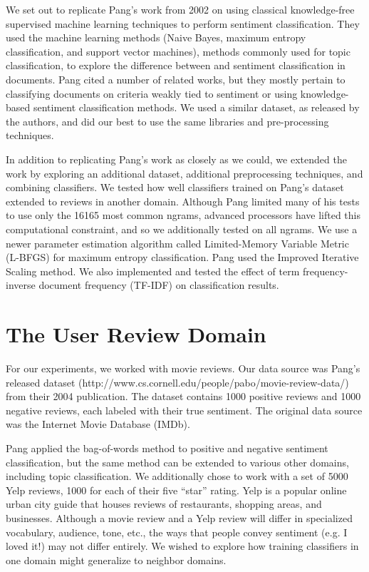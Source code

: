 \documentclass[10pt,twocolumn,letterpaper]{article}
\begin{document}
We set out to replicate Pang’s work from 2002 on using classical knowledge-free supervised machine learning techniques to perform sentiment classification. They used the machine learning methods (Naive Bayes, maximum entropy classification, and support vector machines), methods commonly used for topic classification, to explore the difference between and sentiment classification in documents. Pang cited a number of related works, but they mostly pertain to classifying documents on criteria weakly tied to sentiment or using knowledge-based sentiment classification methods. We used a similar dataset, as released by the authors, and did our best to use the same libraries and pre-processing techniques.

In addition to replicating Pang’s work as closely as we could, we extended the work by exploring an additional dataset, additional preprocessing techniques, and combining classifiers. We tested how well classifiers trained on Pang’s dataset extended to reviews in another domain. Although Pang limited many of his tests to use only the 16165 most common ngrams, advanced processors have lifted this computational constraint, and so we additionally tested on all ngrams. We use a newer parameter estimation algorithm called Limited-Memory Variable Metric (L-BFGS) for maximum entropy classification. Pang used the Improved Iterative Scaling method. We also implemented and tested the effect of term frequency-inverse document frequency (TF-IDF) on classification results.

\section{The User Review Domain}
For our experiments, we worked with movie reviews. Our data source was Pang’s released dataset (http://www.cs.cornell.edu/people/pabo/movie-review-data/) from their 2004 publication. The dataset contains 1000 positive reviews and 1000 negative reviews, each labeled with their true sentiment. The original data source was the Internet Movie Database (IMDb).

Pang applied the bag-of-words method to positive and negative sentiment classification, but the same method can be extended to various other domains, including topic classification. We additionally chose to work with a set of 5000 Yelp reviews, 1000 for each of their five “star” rating. Yelp is a popular online urban city guide that houses reviews of restaurants, shopping areas, and businesses. Although a movie review and a Yelp review will differ in specialized vocabulary, audience, tone, etc., the ways that people convey sentiment (e.g. I loved it!) may not differ entirely. We wished to explore how training classifiers in one domain might generalize to neighbor domains.
\end{document}
